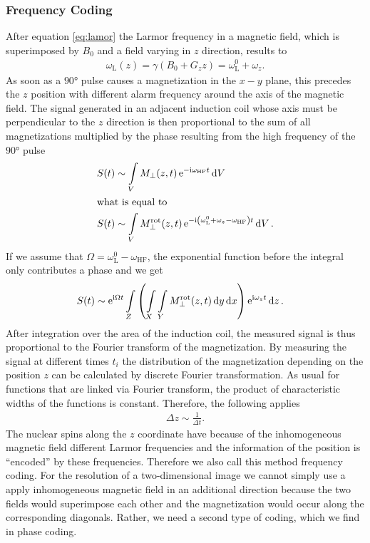 \subsubsection{Frequency Coding}
After equation \ref{eq:lamor} the Larmor frequency in a magnetic field, which is superimposed by $B_0$ and a field varying in $z$ direction, results to
\begin{align}
\omega_\text{L}(z)=\gamma(B_0+G_zz)=\omega_\text{L}^0+\omega_z.
\end{align}
As soon as a $\ang{90}$ pulse causes a magnetization in the $x-y$ plane, this precedes the $z$ position with different alarm frequency around the axis of the magnetic field.
The signal generated in an adjacent induction coil whose axis must be perpendicular to the $z$ direction is then proportional to the sum of all magnetizations multiplied by the phase resulting from the high frequency of the $\ang{90}$ pulse
\begin{align}
S(t)&\sim\int\limits_V M_\bot(z,t)\,\mathrm{e}^{-\mathrm{i}\omega_\text{HF}t}\dd{V}\\
\intertext{what is equal to}
S(t)&\sim\int\limits_V M_\bot^\text{rot}(z,t)\,\mathrm{e}^{-\mathrm{i}\left(\omega_\text{L}^0+\omega_z-\omega_\text{HF}\right)t}\dd{V}.
\end{align}
If we assume that $\Omega=\omega_\text{L}^0-\omega_\text{HF}$, the exponential function before the integral only contributes a phase and we get
\begin{align}
S(t)&\sim\mathrm{e}^{\mathrm{i}\Omega t}\int\limits_Z\left(\int\limits_X\int\limits_Y M_\bot^\text{rot}(z,t)\dd{y}\dd{x}\right)\mathrm{e}^{\mathrm{i}\omega_z t}\dd{z}.
\end{align}
After integration over the area of the induction coil, the measured signal is thus proportional to the Fourier transform of the magnetization.
By measuring the signal at different times $t_i$ the distribution of the magnetization depending on the position $z$ can be calculated by discrete Fourier transformation.
As usual for functions that are linked via Fourier transform, the product of characteristic widths of the functions is constant.
Therefore, the following applies
\begin{align}
\Delta z\sim\frac{1}{\Delta t}.
\end{align}
The nuclear spins along the $z$ coordinate have because of the inhomogeneous magnetic field different Larmor frequencies and the information of the position is \enquote{encoded} by these frequencies.
Therefore we also call this method frequency coding.
For the resolution of a two-dimensional image we cannot simply use a
apply inhomogeneous magnetic field in an additional direction because the two fields would superimpose each other and the magnetization would occur along the corresponding diagonals.
Rather, we need a second type of coding, which we find in phase coding.

